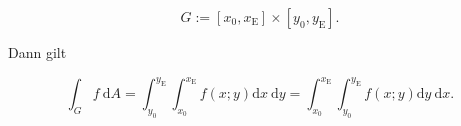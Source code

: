 \documentclass[10pt]{article}
\begin{document}
\begin{equation*}
G:=\left[x_{0}, x_{\mathrm{E}}\right] \times\left[y_{0}, y_{\mathrm{E}}\right] . \tag{2.75}
\end{equation*}


Dann gilt


\begin{equation*}
\int_{G} f \mathrm{~d} A=\int_{y_{0}}^{y_{\mathrm{E}}} \int_{x_{0}}^{x_{\mathrm{E}}} f(x ; y) \mathrm{d} x \mathrm{~d} y=\int_{x_{0}}^{x_{\mathrm{E}}} \int_{y_{0}}^{y_{\mathrm{E}}} f(x ; y) \mathrm{d} y \mathrm{~d} x . \tag{2.76}
\end{equation*}
\end{document}
